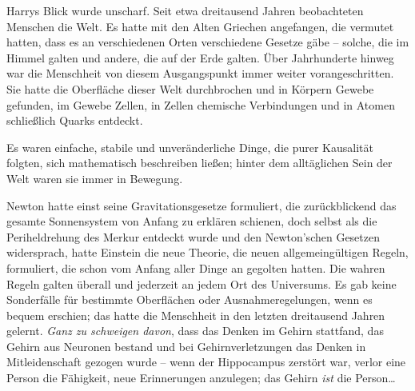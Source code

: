 
Harrys Blick wurde unscharf. Seit etwa dreitausend Jahren beobachteten Menschen die Welt. Es hatte mit den Alten Griechen angefangen, die vermutet hatten, dass es an verschiedenen Orten verschiedene Gesetze gäbe – solche, die im Himmel galten und andere, die auf der Erde galten. Über Jahrhunderte hinweg war die Menschheit von diesem Ausgangspunkt immer weiter vorangeschritten. Sie hatte die Oberfläche dieser Welt durchbrochen und in Körpern Gewebe gefunden, im Gewebe Zellen, in Zellen chemische Verbindungen und in Atomen schließlich Quarks entdeckt.

Es waren einfache, stabile und unveränderliche Dinge, die purer Kausalität folgten, sich mathematisch beschreiben ließen; hinter dem alltäglichen Sein der Welt waren sie immer in Bewegung.

Newton hatte einst seine Gravitationsgesetze formuliert, die zurückblickend das gesamte Sonnensystem von Anfang zu erklären schienen, doch selbst als die Periheldrehung des Merkur entdeckt wurde und den Newton’schen Gesetzen widersprach, hatte Einstein die neue Theorie, die neuen allgemeingültigen Regeln, formuliert, die schon vom Anfang aller Dinge an gegolten hatten. Die wahren Regeln galten überall und jederzeit an jedem Ort des Universums. Es gab keine Sonderfälle für bestimmte Oberflächen oder Ausnahmeregelungen, wenn es bequem erschien; das hatte die Menschheit in den letzten dreitausend Jahren gelernt. \emph{Ganz zu schweigen davon}, dass das Denken im Gehirn stattfand, das Gehirn aus Neuronen bestand und bei Gehirnverletzungen das Denken in Mitleidenschaft gezogen wurde – wenn der Hippocampus zerstört war, verlor eine Person die Fähigkeit, neue Erinnerungen anzulegen; das Gehirn \emph{ist} die Person…

